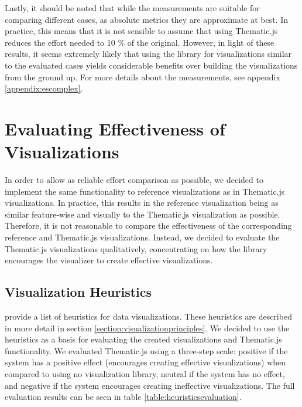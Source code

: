 Lastly, it should be noted that while the measurements are suitable for comparing different cases, as absolute metrics they are approximate at best. In practice, this means that it is not sensible to assume that using Thematic.js reduces the effort needed to 10 \% of the original. However, in light of these results, it seems extremely likely that using the library for visualizations similar to the evaluated cases yields considerable benefits over building the visualizations from the ground up. For more details about the measurements, see appendix \ref{appendix:escomplex}.


\section{Evaluating Effectiveness of Visualizations}

In order to allow as reliable effort comparison as possible, we decided to implement the same functionality to reference visualizations as in Thematic.js visualizations. In practice, this results in the reference visualization being as similar feature-wise and visually to the Thematic.js visualization as possible. Therefore, it is not reasonable to compare the effectiveness of the corresponding reference and Thematic.js visualizations. Instead, we decided to evaluate the Thematic.js visualizations qualitatively, concentrating on how the library encourages the visualizer to create effective visualizations.

\subsection{Visualization Heuristics}

\citet{zuk_heuristics_2006} provide a list of heuristics for data visualizations. These heuristics are described in more detail in section \ref{section:visualizationprinciples}. We decided to use the heuristics as a basis for evaluating the created visualizations and Thematic.js functionality. We evaluated Thematic.js using a three-step scale: positive if the system has a positive effect (encourages creating effective visualizations) when compared to using no visualization library, neutral if the system has no effect, and negative if the system encourages creating ineffective visualizations. The full evaluation results can be seen in table \ref{table:heuristicsevaluation}.

